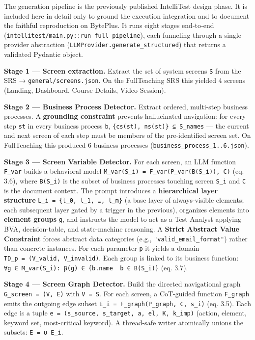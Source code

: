\documentclass[
]{article}
\begin{document}
The generation pipeline is the previously published IntelliTest design
phase. It is included here in detail only to ground the execution
integration and to document the faithful reproduction on BytePlus. It
runs eight stages end-to-end
(\texttt{intellitest/main.py::run\_full\_pipeline}), each funneling
through a single provider abstraction
(\texttt{LLMProvider.generate\_structured}) that returns a validated
Pydantic object.

\textbf{Stage 1 --- Screen extraction.} Extract the set of system
screens \texttt{S} from the SRS → \texttt{general/screens.json}. On the
FullTeaching SRS this yielded 4 screens (Landing, Dashboard, Course
Details, Video Session).

\textbf{Stage 2 --- Business Process Detector.} Extract ordered,
multi-step business processes. A \textbf{grounding constraint} prevents
hallucinated navigation: for every step \texttt{st} in every business
process \texttt{b}, \texttt{\{cs(st),\ ns(st)\}\ ⊆\ S\_names} --- the
current and next screen of each step must be members of the
pre-identified screen set. On FullTeaching this produced 6 business
processes (\texttt{business\_process\_1..6.json}).

\textbf{Stage 3 --- Screen Variable Detector.} For each screen, an LLM
function \texttt{F\_var} builds a behavioral model
\texttt{M\_var(S\_i)\ =\ F\_var(P\_var(B(S\_i)),\ C)} (eq. 3.6), where
\texttt{B(S\_i)} is the subset of business processes touching screen
\texttt{S\_i} and \texttt{C} is the document context. The prompt
introduces a \textbf{hierarchical layer structure}
\texttt{L\_i\ =\ \{l\_0,\ l\_1,\ …,\ l\_m\}} (a base layer of
always-visible elements; each subsequent layer gated by a trigger in the
previous), organizes elements into \textbf{element groups} \texttt{g},
and instructs the model to act as a Test Analyst applying BVA,
decision-table, and state-machine reasoning. A \textbf{Strict Abstract
Value Constraint} forces abstract data categories (e.g.,
\texttt{"valid\_email\_format"}) rather than concrete instances. For
each parameter \texttt{p} it yields a domain
\texttt{TD\_p\ =\ (V\_valid,\ V\_invalid)}. Each group is linked to its
business function:
\texttt{∀g\ ∈\ M\_var(S\_i):\ β(g)\ ∈\ \{b.name\ \textbar{}\ b\ ∈\ B(S\_i)\}}
(eq. 3.7).

\textbf{Stage 4 --- Screen Graph Detector.} Build the directed
navigational graph \texttt{G\_screen\ =\ (V,\ E)} with \texttt{V\ =\ S}.
For each screen, a CoT-guided function \texttt{F\_graph} emits the
outgoing edge subset \texttt{E\_i\ =\ F\_graph(P\_graph,\ C,\ s\_i)}
(eq. 3.5). Each edge is a tuple
\texttt{e\ =\ (s\_source,\ s\_target,\ a,\ el,\ K,\ k\_imp)} (action,
element, keyword set, most-critical keyword). A thread-safe writer
atomically unions the subsets: \texttt{E\ =\ ∪\ E\_i}.
\end{document}
